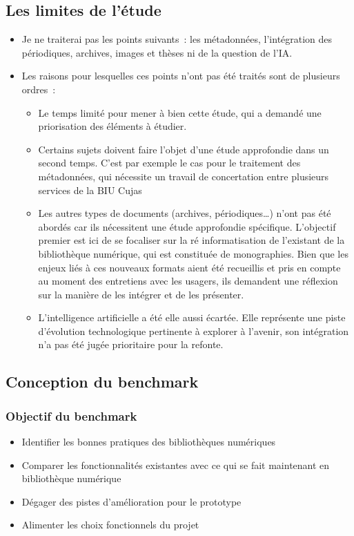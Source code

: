 \subsection{Les limites de l’étude}
\begin{itemize}
	\item Je ne traiterai pas les points suivants : les métadonnées, l’intégration des périodiques, archives, images et thèses ni de la question de l’IA. 
\item Les raisons pour lesquelles ces points n’ont pas été traités sont de plusieurs ordres :
\begin{itemize}
	\item Le temps limité pour mener à bien cette étude, qui a demandé une priorisation des éléments à étudier. 
\item Certains sujets doivent faire l’objet d’une étude approfondie dans un second temps. C’est par exemple le cas pour le traitement des métadonnées, qui nécessite un travail de concertation entre plusieurs services de la BIU Cujas 
\item Les autres types de documents (archives, périodiques…) n’ont pas été abordés car ils nécessitent une étude approfondie spécifique. L'objectif premier est ici de se focaliser sur la ré informatisation de l'existant de la bibliothèque numérique, qui est constituée de monographies. Bien que les enjeux liés à ces nouveaux formats aient été recueillis et pris en compte au moment des entretiens avec les usagers, ils demandent une réflexion sur la manière de les intégrer et de les présenter. 
\item L’intelligence artificielle a été elle aussi écartée. Elle représente une piste d’évolution technologique pertinente à explorer à l’avenir, son intégration n’a pas été jugée prioritaire pour la refonte.
\end{itemize}
\end{itemize}

\subsection{Conception du benchmark}
\subsubsection{Objectif du benchmark}
\begin{itemize}
	\item Identifier les bonnes pratiques des bibliothèques numériques
\item Comparer les fonctionnalités existantes avec ce qui se fait maintenant en bibliothèque numérique
\item Dégager des pistes d’amélioration pour le prototype
\item Alimenter les choix fonctionnels du projet
\end{itemize}

